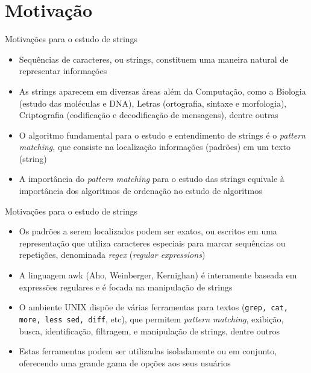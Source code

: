 \section{Motivação}

\begin{frame}[fragile]{Motivações para o estudo de strings}

    \begin{itemize}
        \item Sequências de caracteres, ou strings, constituem uma maneira natural de representar informações
        \pause

        \item As strings aparecem em diversas áreas além da Computação, como a Biologia (estudo das moléculas e DNA), Letras (ortografia, sintaxe e morfologia), Criptografia (codificação e decodificação de mensagens), dentre outras
        \pause

        \item O algoritmo fundamental para o estudo e entendimento de strings é o \textit{pattern 
        matching}, que consiste na localização informações (padrões) em um texto (string)
        \pause

        \item A importância do \textit{pattern matching} para o estudo das strings equivale à 
            importância dos algoritmos de ordenação no estudo de algoritmos

    \end{itemize}

\end{frame}

\begin{frame}[fragile]{Motivações para o estudo de strings}

    \begin{itemize}
        \item Os padrões a serem localizados podem ser exatos, ou escritos em uma representação 
            que utiliza caracteres especiais para marcar sequências ou repetições, denominada 
            \textit{regex} (\textit{regular expressions})
        \pause

        \item A linguagem awk (Aho, Weinberger, Kernighan) é interamente baseada em expressões 
            regulares e é focada na manipulação de strings
        \pause

        \item O ambiente UNIX dispõe de várias ferramentas para textos (\texttt{grep, cat, more, less sed, diff}, etc), que permitem \textit{pattern matching}, exibição, busca, identificação, filtragem, e manipulação de strings, dentre outros
        \pause

        \item Estas ferramentas podem ser utilizadas isoladamente ou em conjunto, oferecendo uma grande gama de opções aos seus usuários
    \end{itemize}

\end{frame}
